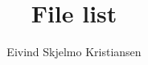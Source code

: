 \documentclass{report}
\begin{document}
\title{File list}
\author{Eivind Skjelmo Kristiansen}
\maketitle

\listoftables
\cleardoublepage


\end{document}

